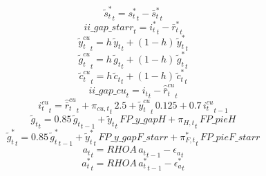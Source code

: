 \begin{dmath}
{{\tilde s_t^*}}_{t}={{s_t^*}}_{t}-{{\bar s_t^*}}_{t}
\end{dmath}
\begin{dmath}
{ii\_gap\_starr}_{t}={{i_t^*}}_{t}-{{\bar r_t^*}}_{t}
\end{dmath}
\begin{dmath}
{{\tilde y_t^{cu}}}_{t}={h}\, {{\tilde y_t}}_{t}+\left(1-{h}\right)\, {{\tilde y_t^*}}_{t}
\end{dmath}
\begin{dmath}
{{\tilde g_t^{cu}}}_{t}={h}\, {{\tilde g_t}}_{t}+\left(1-{h}\right)\, {{\tilde g_t^*}}_{t}
\end{dmath}
\begin{dmath}
{{\tilde c_t^{cu}}}_{t}={h}\, {{\tilde c_t}}_{t}+\left(1-{h}\right)\, {{\tilde c_t^*}}_{t}
\end{dmath}
\begin{dmath}
{ii\_gap\_cu}_{t}={{i_t}}_{t}-{{\hat {\bar r}_t^{cu}}}_{t}
\end{dmath}
\begin{dmath}
{{i_t^{cu}}}_{t}={{\hat {\bar r}_t^{cu}}}_{t}+{{\pi_{cu,t}}}_{t}\, 2.5+{{\tilde y_t^{cu}}}_{t}\, 0.125+0.7\, {{i_t^{cu}}}_{t-1}
\end{dmath}
\begin{dmath}
{{\tilde g_t}}_{t}=0.85\, {{\tilde g_t}}_{t-1}+{{\tilde y_t}}_{t}\, {FP\_y\_gapH}+{{\pi_{H,t}}}_{t}\, {FP\_pieH}
\end{dmath}
\begin{dmath}
{{\tilde g_t^*}}_{t}=0.85\, {{\tilde g_t^*}}_{t-1}+{{\tilde y_t^*}}_{t}\, {FP\_y\_gapF\_starr}+{{\pi_{F,t}^*}}_{t}\, {FP\_pieF\_starr}
\end{dmath}
\begin{dmath}
{{a_t}}_{t}={RHOA}\, {{a_t}}_{t-1}-{{\epsilon_a}}_{t}
\end{dmath}
\begin{dmath}
{{a_t^*}}_{t}={RHOA}\, {{a_t^*}}_{t-1}-{{\epsilon_a^*}}_{t}
\end{dmath}
